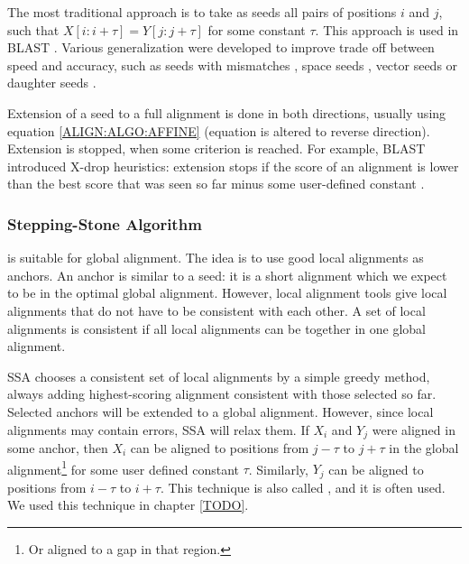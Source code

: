 The most traditional approach is to take as seeds all pairs of positions $i$
and $j$, such that $X[i:i+\tau]=Y[j:j+\tau]$ for some
constant $\tau$. This approach is used in BLAST \cite{Altschul1990}.  Various
generalization were developed to improve trade off between
speed and accuracy, such as seeds with mismatches \cite{Kent2002}, space seeds
\cite{Ma2002}, vector seeds \cite{Brejova2005vector} or daughter seeds
\cite{Csuros2005}.

Extension of a seed to a full alignment is done in both directions, usually
using equation \ref{ALIGN:ALGO:AFFINE} (equation is altered to reverse
direction). Extension is stopped, when some criterion is reached. For example,
BLAST introduced X-drop heuristics: extension stops if the score of an alignment
is lower than the best score that was seen so far minus some user-defined
constant \cite{Altschul1997}.

\subsubsection{Stepping-Stone Algorithm}
\label{SECTION:SSA}

\cite{Meyer2002,Pairagon2009} is suitable for global alignment. The idea is to
use good local alignments as anchors. An anchor is similar to a seed: it is a
short alignment which we expect to be in the optimal global alignment.
However, local alignment tools give local alignments that do not have to be
consistent with each other. A set of local alignments is consistent if all
local alignments can be together in one global alignment.
\begin{comment}
Let $A$ and $B$ be a
local alignments of sequences $X$ and $Y$ and $(i,j)$ be the position of the
last alignment column of $A$ in the dynamic programming matrix and $(k,l)$ be
the position of the first alignment column of $B$ in the dynamic programming
matrix. Then $A$ and $B$ are consistent if $i<k$ and $j<l$.  Therefore we need
to choose a consistent subset of alignments.
\end{comment}

SSA chooses a consistent set of local alignments  by a simple greedy method,
always adding highest-scoring alignment consistent with those selected so far.
Selected anchors will be extended to a global alignment. However, since local
alignments may contain errors, SSA will relax them. If $X_i$ and $Y_j$ were
aligned in some anchor, then $X_i$ can be aligned to positions from $j-\tau$ to
$j+\tau$ in the global alignment\footnote{Or aligned to a gap in that region.}
for some user defined constant $\tau$. Similarly, $Y_j$ can be aligned to
positions from $i-\tau$ to $i+\tau$. This technique is also called ,
and it is often used. We used this technique in chapter \ref{TODO}.

